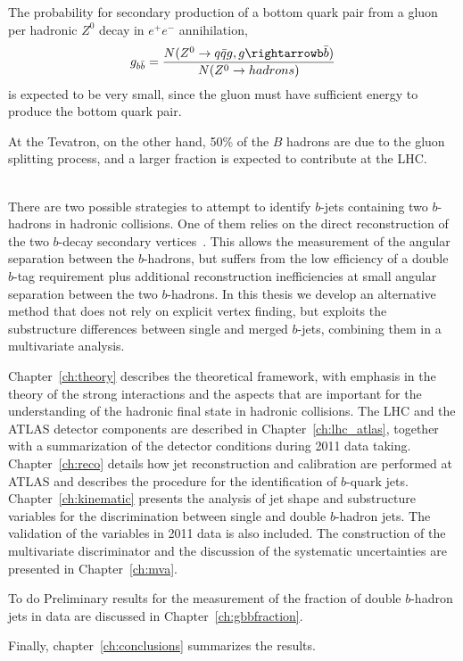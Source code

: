  The probability for secondary production of a bottom quark pair from a gluon per hadronic $Z^0$ decay in $e^+e^-$ annihilation, 
\begin{equation} 
g_{b\bar{b}} = \frac{N(Z^0 \rightarrow q\bar{q}g,g\rightarrowb\bar{b} )}{N(Z^0\rightarrow hadrons)}
\end{equation} 
is expected to be very small, since the gluon must have sufficient energy to produce the bottom quark pair. 

 At the Tevatron, on the other hand, 50\% of the $B$
 hadrons are due to the gluon splitting process, and a larger fraction is expected to contribute at the LHC.








\\[5mm]
There are two possible strategies to attempt to identify $b$-jets containing two $b$-hadrons in hadronic collisions. One of them relies on the direct reconstruction of the two $b$-decay secondary vertices~\cite{CDFAzimutalCorrelation}. This %
allows the measurement of the angular separation between the $b$-hadrons, but suffers from the low efficiency of a double $b$-tag requirement plus additional reconstruction inefficiencies at small angular separation between the two $b$-hadrons. In this thesis we develop an alternative method that does not rely on explicit vertex finding, but exploits the substructure differences between single and merged $b$-jets, combining them in a multivariate analysis. 

Chapter~\ref{ch:theory} describes the theoretical framework, with emphasis in the theory of the strong interactions and the aspects that are important for the understanding of the hadronic final state in hadronic collisions. The LHC and the ATLAS detector components  are described in Chapter~\ref{ch:lhc_atlas}, together with a summarization of the detector conditions during 2011 data taking.  Chapter~\ref{ch:reco} details how jet reconstruction and calibration are performed at ATLAS and describes the procedure for the identification of $b$-quark jets. Chapter~\ref{ch:kinematic} presents the analysis of jet shape and substructure variables for the discrimination between single and double $b$-hadron jets. The validation of the variables in 2011 data is also included.   The construction of the multivariate discriminator  and the discussion of the systematic uncertainties are presented in Chapter~\ref{ch:mva}. 

{\sc To do}
Preliminary results for the measurement of the fraction of double $b$-hadron jets in data are discussed in Chapter~\ref{ch:gbbfraction}. 

Finally, chapter~\ref{ch:conclusions} summarizes the results. 




